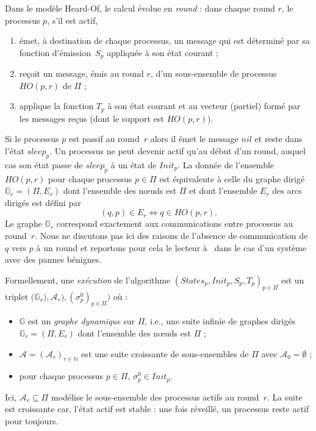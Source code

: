 \documentclass{article}
\begin{document}
Dans le mod\`ele Heard-Of, le calcul \'evolue en \emph{round} : dans chaque round $r$, 
	le processus $p$, s'il est actif,  
	\begin{enumerate}
	\item \'emet, \`a destination de chaque processus, un message qui est d\'etermin\'e par sa fonction d'\'emission~$S_p$  
		appliqu\'ee \`a son \'etat courant ;
	\item re\c{c}oit un message, \'emis au round $r$, d'un sous-ensemble de processus $HO(p,r)$ de $\Pi$ ;
        \item  applique la fonction  $T_p$ \`a son \'etat courant  et au vecteur (partiel) form\'e par les messages re\c{c}us (dont le support est 
         $HO(p,r)$).
	\end{enumerate}
Si le processus $p$ est passif au round~$r$ alors il \'emet le message $nil$ et reste dans l'\'etat $sleep_p$.
Un processus ne peut devenir actif qu'au d\'ebut d'un round, auquel cas son \'etat passe de $sleep_p$ \`a 
	un \'etat de $Init_p$.
La donn\'ee de l'ensemble $HO(p,r)$ pour chaque processus $p \in \Pi$ est \'equivalente \`a celle du graphe dirig\'e
	$\mathds{G}_r = (\Pi, E_r)$ dont l'ensemble des n\oe uds est $\Pi$ et dont l'ensemble $E_r$ des arcs dirig\'es 
	est d\'efini par
	$$ (q,p) \in E_r \Leftrightarrow q \in HO(p,r) .$$	
Le graphe $\mathds{G}_r $ correspond exactement aux communications entre processus au round~$r$.
Nous ne discutons pas ici des raisons de l'absence de communication de $q$ vers $p$ \`a un round et reportons pour cela  le lecteur 
	\`a~\cite{CB09} dans le cas d'un syst\`eme avec des pannes b\'enignes.

Formellement, une \emph{ex\'ecution} de l'algorithme  $(States_p, Init_p, S_p,T_p)_{p\in \Pi}$ est 
	un triplet $\big( \mathds{G}_r) ,  \mathcal{A}_r) , (\sigma^0_p)_{p \in \Pi} \big)$ où :
	\begin{itemize}
	\item $\mathds{G}$ est un \emph{graphe dynamique} sur $\Pi$, i.e., une suite infinie de graphes dirig\'es 
	$\mathds{G}_r = (\Pi, E_r)$ dont l'ensemble des n\oe uds est $\Pi$ ; 
	\item $\mathcal{A} = (\mathcal{A}_r)_{r \in \mathds{N}}$ est une suite croissante de sous-ensembles de $\Pi$ 
	avec $\mathcal{A}_0 = \emptyset$ ;
	\item pour chaque processus $p\in \Pi$, $\sigma^0_p \in Init_p$.
	\end{itemize}
Ici,  $\mathcal{A}_r \subseteq \Pi$ modélise le sous-ensemble des processus actifs au round~$r$.
La suite est croissante car, l'\'etat actif est stable : une fois r\'eveill\'e, un processus reste actif pour toujours.
\end{document}
